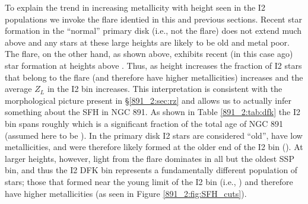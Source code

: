 To explain the trend in increasing metallicity with height seen in the
I2 populations we invoke the flare identied in this and previous
sections. Recent star formation in the ``normal'' primary disk (i.e.,
not the flare) does not extend much above  and any
stars at these large heights are likely to be old and metal poor. The
flare, on the other hand, as shown above, exhibits recent (in this
case  ago) star formation at heights above
. Thus, as height increases the fraction of I2 stars that
belong to the flare (and therefore have higher metallicities)
increases and the average $Z_L$ in the I2 bin increases. This
interpretation is consistent with the morphological picture present in
\S\ref{891_2:sec:rz} and allows us to actually infer something about the SFH
in NGC 891. As shown in Table \ref{891_2:tab:dfk} the I2 bin spans roughly
 which is a significant fraction of the total age of NGC
891 (assumed here to be ). In the primary disk I2 stars
are considered ``old'', have low metallicities, and were therefore
likely formed at the older end of the I2 bin (). At
larger heights, however, light from the flare dominates in all but the
oldest SSP bin, and thus the I2 DFK bin represents a fundamentally
different population of stars; those that formed near the young limit
of the I2 bin (i.e., ) and therefore have higher
metallicities (as seen in Figure \ref{891_2:fig:SFH_cuts}).





